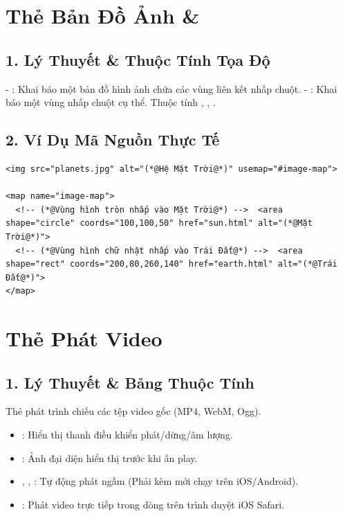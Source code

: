 \section{Thẻ Bản Đồ Ảnh  \& }
\subsection{1. Lý Thuyết \& Thuộc Tính Tọa Độ}
- : Khai báo một bản đồ hình ảnh chứa các vùng liên kết nhấp chuột.
- : Khai báo một vùng nhấp chuột cụ thể. Thuộc tính , , .

\subsection{2. Ví Dụ Mã Nguồn Thực Tế}
\begin{lstlisting}[language=HTML5, caption={Ví dụ tạo vùng nhấp chuột tương tác trên ảnh}]
<img src="planets.jpg" alt="(*@Hệ Mặt Trời@*)" usemap="#image-map">

<map name="image-map">
  <!-- (*@Vùng hình tròn nhấp vào Mặt Trời@*) -->  <area shape="circle" coords="100,100,50" href="sun.html" alt="(*@Mặt Trời@*)">
  <!-- (*@Vùng hình chữ nhật nhấp vào Trái Đất@*) -->  <area shape="rect" coords="200,80,260,140" href="earth.html" alt="(*@Trái Đất@*)">
</map>
\end{lstlisting}

\section{Thẻ Phát Video }
\subsection{1. Lý Thuyết \& Bảng Thuộc Tính}
Thẻ  phát trình chiếu các tệp video gốc (MP4, WebM, Ogg).

\begin{itemize}
    \item {}: Hiển thị thanh điều khiển phát/dừng/âm lượng.
    \item {}: Ảnh đại diện hiển thị trước khi ấn play.
    \item {}, , : Tự động phát ngầm (Phải kèm  mới chạy trên iOS/Android).
    \item {}: Phát video trực tiếp trong dòng trên trình duyệt iOS Safari.
\end{itemize}

